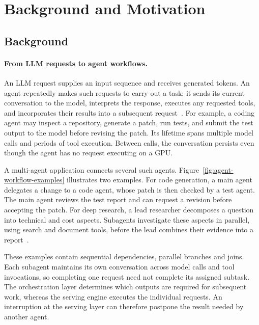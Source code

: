 \section{Background and Motivation}
\label{sec:background-motivation}

\subsection{Background}
\label{sec:motivation-background}

\paragraph{From LLM requests to agent workflows.}
An LLM request supplies an input sequence and receives generated tokens.
An agent repeatedly makes such requests to carry out a task: it sends
its current conversation to the model, interprets the response, executes
any requested tools, and incorporates their results into a subsequent
request~\cite{wu2023autogen}. For example, a coding agent may inspect a
repository, generate a patch, run tests, and submit the test output to
the model before revising the patch. Its lifetime spans multiple model
calls and periods of tool execution. Between calls, the conversation
persists even though the agent has no request executing on a GPU.

A multi-agent application connects several such agents.
Figure~\ref{fig:agent-workflow-examples} illustrates two examples.
For code generation, a main agent delegates a change to a code agent,
whose patch is then checked by a test agent. The main agent reviews the
test report and can request a revision before accepting the patch.
For deep research, a lead researcher decomposes a question into
technical and cost aspects. Subagents investigate these aspects in
parallel, using search and document tools, before the lead combines
their evidence into a report~\cite{anthropic2025multiagent}.

These examples contain sequential dependencies, parallel branches and
joins. Each subagent maintains its own conversation across model calls
and tool invocations, so completing one request need not complete its
assigned subtask. The orchestration layer determines which outputs are
required for subsequent work, whereas the serving engine executes the
individual requests. An interruption at the serving layer can therefore
postpone the result needed by another agent.

